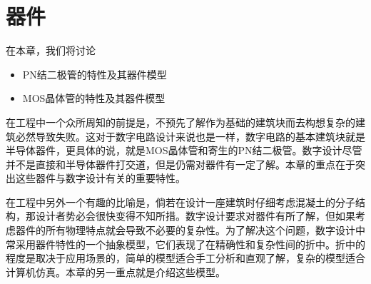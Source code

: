\chapter{器件}
在本章，我们将讨论
\begin{itemize}
    \item PN结二极管的特性及其器件模型
    \item MOS晶体管的特性及其器件模型
\end{itemize}

在工程中一个众所周知的前提是，不预先了解作为基础的建筑块而去构想复杂的建筑必然导致失败。这对于数字电路设计来说也是一样，数字电路的基本建筑块就是半导体器件，更具体的说，就是MOS晶体管和寄生的PN结二极管。数字设计尽管并不是直接和半导体器件打交道，但是仍需对器件有一定了解。本章的重点在于突出这些器件与数字设计有关的重要特性。

在工程中另外一个有趣的比喻是，倘若在设计一座建筑时仔细考虑混凝土的分子结构，那设计者势必会很快变得不知所措。数字设计要求对器件有所了解，但如果考虑器件的所有物理特点就会导致不必要的复杂性。为了解决这个问题，数字设计中常采用器件特性的一个抽象模型，它们表现了在精确性和复杂性间的折中。折中的程度是取决于应用场景的，简单的模型适合手工分析和直观了解，复杂的模型适合计算机仿真。本章的另一重点就是介绍这些模型。

